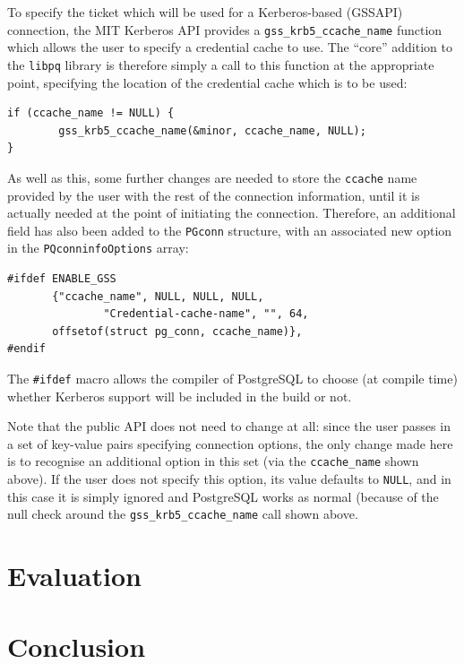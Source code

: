 \documentclass{article}
\begin{document}

To specify the ticket which will be used for a Kerberos-based (GSSAPI) connection, the MIT Kerberos API provides a \verb+gss_krb5_ccache_name+ function which allows the user to specify a credential cache to use. The ``core'' addition to the \texttt{libpq} library is therefore simply a call to this function at the appropriate point, specifying the location of the credential cache which is to be used:

\begin{verbatim}
if (ccache_name != NULL) {
        gss_krb5_ccache_name(&minor, ccache_name, NULL);
}
\end{verbatim}

As well as this, some further changes are needed to store the \texttt{ccache} name provided by the user with the rest of the connection information, until it is actually needed at the point of initiating the connection. Therefore, an additional field has also been added to the \texttt{PGconn} structure, with an associated new option in the \texttt{PQconninfoOptions} array:

\begin{verbatim}
#ifdef ENABLE_GSS
       {"ccache_name", NULL, NULL, NULL,
               "Credential-cache-name", "", 64,
       offsetof(struct pg_conn, ccache_name)},
#endif
\end{verbatim}

The \verb+#ifdef+ macro allows the compiler of PostgreSQL to choose (at compile time) whether Kerberos support will be included in the build or not.

Note that the public API does not need to change at all: since the user passes in a set of key-value pairs specifying connection options, the only change made here is to recognise an additional option in this set (via the \verb+ccache_name+ shown above). If the user does not specify this option, its value defaults to \texttt{NULL}, and in this case it is simply ignored and PostgreSQL works as normal (because of the null check around the \verb+gss_krb5_ccache_name+ call shown above.


\section{Evaluation}

\section{Conclusion}
\end{document}
